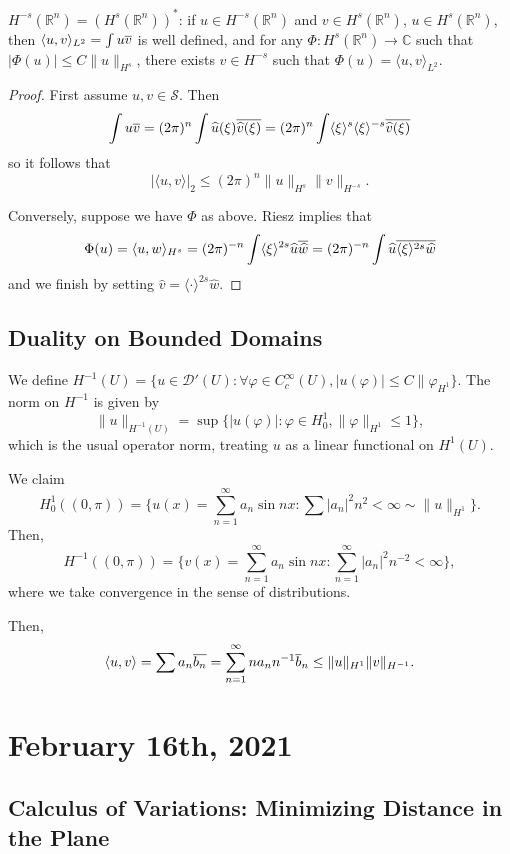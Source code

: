 \documentclass[12pt]{scrartcl}
\newcommand{\R}{\mathbb{R}}
\newcommand{\C}{\mathbb C}
\renewcommand{\hat}{\widehat}
\newcommand{\<}{\langle}
\renewcommand{\>}{\rangle}
\let \phi \varphi
\let \mc \mathcal
\begin{document}
\begin{fact} $H^{-s}(\R^n) = (H^s(\R^n))^*$: if $u \in H^{-s}(\R^n)$ and $v \in H^s(\R^n)$, $u \in H^s(\R^n)$, then $\<u, v\>_{L^2} = \int u\ol{v}$ is well defined, and for any $\Phi: H^s(\R^n) \to \C$ such that $|\Phi(u)| \le C \|u\|_{H^s}$, there exists $v \in H^{-s}$ such that $\Phi(u) = \<u, v\>_{L^2}$.
\end{fact}
\begin{proof}
First assume $u, v \in \mc S$.  Then $$\int u\ol v = (2\pi)^n \int \hat{u}(\xi) \ol{\hat{v}(\xi)} = (2\pi)^n\int \<\xi\>^s \<\xi\>^{-s} \ol{\hat{v}(\xi)}$$
so it follows that $$|\<u, v\>|_2 \le (2\pi)^n \| u\|_{H^s} \|v\|_{H^{-s}}.$$

Conversely, suppose we have $\Phi$ as above.  Riesz implies that $$\Phi(u) = \<u, w\>_{H^s} = (2\pi)^{-n} \int\<\xi\>^{2s} \hat{u} \ol{\hat w} = (2\pi)^{-n} \int \hat{u} \ol{\<\xi\>^{2s} \hat{w}}$$
and we finish by setting $\hat{v} = \<\cdot\>^{2s} \hat{w}$.
\end{proof}

\subsection{Duality on Bounded Domains}
We define $H^{-1}(U) = \{u \in \mc D'(U) : \forall \phi \in C_c^\infty(U), |u(\phi)| \le C \|\phi_{H^1}\}$.  The norm on $H^{-1}$ is given by 
$$\|u\|_{H^{-1}(U)} = \sup\{|u(\phi)| : \phi \in H_0^1, \|\phi\|_{H^1} \le 1\},$$
which is the usual operator norm, treating $u$ as a linear functional on $H^1(U)$.

\begin{example} We claim $$H_0^1((0, \pi)) = \{u(x) = \sum_{n=1}^\infty a_n \sin{nx}: \sum |a_n|^2n^2 < \infty \sim \|u\|_{H^1}\}.$$  Then, $$H^{-1}((0, \pi)) = \{v(x) = \sum_{n=1}^\infty a_n \sin{nx}: \sum_{n=1}^\infty |a_n|^2 n^{-2} < \infty\},$$ where we take convergence in the sense of distributions.

Then, $$\<u, v\> = \sum a_n \ol{b_n} = \sum_{n=1}^\infty na_n n^{-1} \ol b_n \le \|u\|_{H^1} \|v\|_{H^{-1}}.$$
\end{example}
\pagebreak
\section{February 16th, 2021}
\subsection{Calculus of Variations: Minimizing Distance in the Plane}
\end{document}
